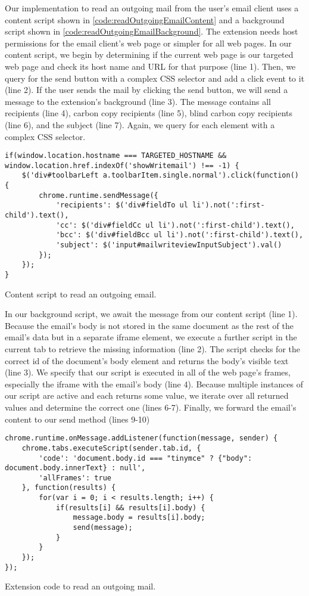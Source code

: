 	Our implementation to read an outgoing mail from the user's email client uses a content script shown in \autoref{code:readOutgoingEmailContent} and a background script shown in \autoref{code:readOutgoingEmailBackground}. The extension needs host permissions for the email client's web page or simpler for all web pages. In our content script, we begin by determining if the current web page is our targeted web page and check its host name and URL for that purpose (line 1). Then, we query for the send button with a complex CSS selector and add a click event to it (line 2). If the user sends the mail by clicking the send button, we will send a message to the extension's background (line 3). The message contains all recipients (line 4), carbon copy recipients (line 5), blind carbon copy recipients (line 6), and the subject (line 7). Again, we query for each element with a complex CSS selector.
	
	\begin{code}
		\begin{lstlisting}
if(window.location.hostname === TARGETED_HOSTNAME && window.location.href.indexOf('showWritemail') !== -1) {
	$('div#toolbarLeft a.toolbarItem.single.normal').click(function() {
		chrome.runtime.sendMessage({
			'recipients': $('div#fieldTo ul li').not(':first-child').text(),
			'cc': $('div#fieldCc ul li').not(':first-child').text(),
			'bcc': $('div#fieldBcc ul li').not(':first-child').text(),
			'subject': $('input#mailwriteviewInputSubject').val()
		});
	});
}
\end{lstlisting}
		\caption{Content script to read an outgoing email.}
		\label{code:readOutgoingEmailContent}
	\end{code}
	
	In our background script, we await the message from our content script (line 1). Because the email's body is not stored in the same document as the rest of the email's data but in a separate iframe element, we execute a further script in the current tab to retrieve the missing information (line 2). The script checks for the correct id of the document's body element and returns the body's visible text (line 3). We specify that our script is executed in all of the web page's frames, especially the iframe with the email's body (line 4). Because multiple instances of our script are active and each returns some value, we iterate over all returned values and determine the correct one (lines 6-7). Finally, we forward the email's content to our send method (lines 9-10) 
	
	\begin{code}
		\begin{lstlisting}
chrome.runtime.onMessage.addListener(function(message, sender) {
	chrome.tabs.executeScript(sender.tab.id, {
		'code': 'document.body.id === "tinymce" ? {"body": document.body.innerText} : null',
		'allFrames': true
	}, function(results) {
		for(var i = 0; i < results.length; i++) {
			if(results[i] && results[i].body) {
				message.body = results[i].body;
				send(message);
			}
		}
	});
});
\end{lstlisting}
		\caption{Extension code to read an outgoing mail.}
		\label{code:readOutgoingEmailBackground}
	\end{code}
	

